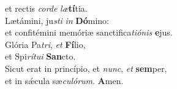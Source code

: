 \evenverse et rectis \textit{cor}\textit{de} \textit{læ}\textbf{tí}tia.\\
\oddverse Lætámini, ju\textit{sti} \textit{in} \textbf{Dó}mino:~\*\\
\oddverse et confitémini memóriæ sanctifica\textit{ti}\textit{ó}\textit{nis} \textbf{e}jus.\\
\evenverse Glória Pa\textit{tri}, \textit{et} \textbf{Fí}lio,~\*\\
\evenverse et Spi\textit{rí}\textit{tu}\textit{i} \textbf{San}cto.\\
\oddverse Sicut erat in princípio, et \textit{nunc}, \textit{et} \textbf{sem}per,~\*\\
\oddverse et in sǽcula sæ\textit{cu}\textit{ló}\textit{rum}. \textbf{A}men.\\
